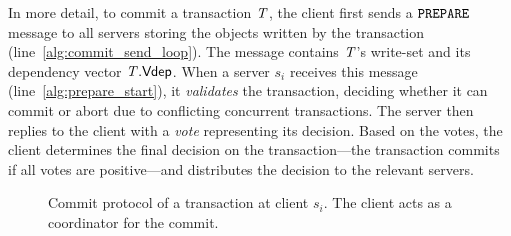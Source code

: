 In more detail, to commit a transaction $\mathit{T}$, the client first sends a ${\tt PREPARE}$ message to all servers storing the objects written by the transaction (line~\ref{alg:commit_send_loop}). The message contains $\mathit{T}$'s write-set and its dependency vector $\mathit{T}.\mathsf{Vdep}$. When a server $s_i$ receives this message (line~\ref{alg:prepare_start}), it \emph{validates} the transaction, deciding whether it can commit or abort due to conflicting concurrent transactions. The server then replies to the client with a \emph{vote} representing its decision. Based on the votes, the client determines the final decision on the transaction---the transaction commits if all votes are positive---and distributes the decision to the relevant servers.

\begin{figure}[h]
\begin{algorithm}[H]

\end{algorithm}
\caption{Commit protocol of a transaction at client $s_i$. The client acts as a coordinator for the commit.}
\end{figure}

